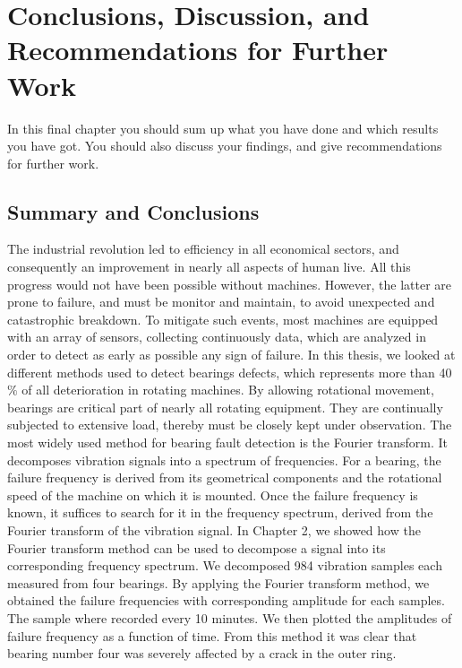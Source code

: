 \documentclass[thesis.tex]{subfiles}
\begin{document}
\chapter[Conclusions]{Conclusions, Discussion, and Recommendations for Further Work}
\label{ch:conclusions}
In this final chapter you should sum up what you have done and which results you have got. 
You should also discuss your findings, and give recommendations for further work.

\section{Summary and Conclusions}
\label{sec:summary_and_conclusions}
%
The industrial revolution led to efficiency in all economical sectors, and consequently an improvement in nearly all aspects of human live. All this progress would not have been possible without machines. However, the latter are prone to failure, and must be monitor and maintain, to avoid unexpected and catastrophic breakdown. To mitigate such events, most machines are equipped with an array of sensors, collecting continuously data, which are analyzed in order to detect as early as possible any sign of failure.
\justify
In this thesis, we looked at different methods used to detect bearings defects, which represents more than 40 $\%$ of all deterioration in rotating machines. By allowing rotational movement, bearings are critical part of nearly all rotating equipment. They are continually subjected to extensive load, thereby must be closely kept under observation. The most widely used method for bearing fault detection is the Fourier transform. It decomposes vibration signals into a spectrum of frequencies. For a bearing, the failure frequency is derived from its geometrical components and the rotational speed of the machine on which it is mounted. Once the failure frequency is known, it suffices to search for it in the frequency spectrum, derived from the Fourier transform of the vibration signal.
\clearpage
\justify
In Chapter 2, we showed how the Fourier transform method can be used to decompose a signal into its corresponding frequency spectrum. We decomposed 984 vibration samples each measured from four bearings. By applying the Fourier transform method, we obtained the failure frequencies with corresponding amplitude for each samples. The sample where recorded every 10 minutes. We then plotted the amplitudes of failure frequency as a function of time. From this method it was clear that bearing number four was severely affected by a crack in the outer ring. 
\end{document}
